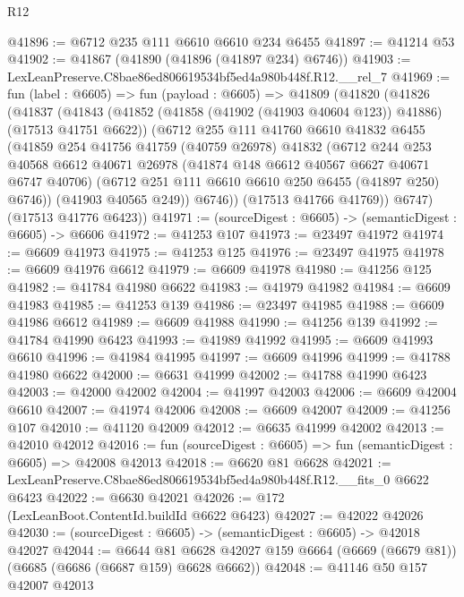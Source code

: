 \begin{lexlean}{R12}
\begin{coremodule}
@41896 := @6712 @235 @111 @6610 @6610 @234 @6455
@41897 := @41214 @53
@41902 := @41867 (@41890 (@41896 (@41897 @234) @6746))
@41903 := LexLeanPreserve.C8bae86ed806619534bf5ed4a980b448f.R12.__rel_7
@41969 := fun (label : @6605) =>
  fun (payload : @6605) =>
  @41809
    (@41820
      (@41826
        (@41837
          (@41843
            (@41852 (@41858 (@41902 (@41903 @40604 @123)) @41886) (@17513 @41751 @6622))
            (@6712
              @255
              @111
              @41760
              @6610
              @41832
              @6455
              (@41859
                @254
                @41756
                @41759
                (@40759 @26978)
                @41832
                (@6712
                  @244
                  @253
                  @40568
                  @6612
                  @40671
                  @26978
                  (@41874 @148 @6612 @40567 @6627 @40671 @6747 @40706)
                  (@6712 @251 @111 @6610 @6610 @250 @6455 (@41897 @250) @6746))
                (@41903 @40565 @249))
              @6746))
          (@17513 @41766 @41769))
        @6747)
      (@17513 @41776 @6423))
@41971 := (sourceDigest : @6605) -> (semanticDigest : @6605) -> @6606
@41972 := @41253 @107
@41973 := @23497 @41972
@41974 := @6609 @41973
@41975 := @41253 @125
@41976 := @23497 @41975
@41978 := @6609 @41976 @6612
@41979 := @6609 @41978
@41980 := @41256 @125
@41982 := @41784 @41980 @6622
@41983 := @41979 @41982
@41984 := @6609 @41983
@41985 := @41253 @139
@41986 := @23497 @41985
@41988 := @6609 @41986 @6612
@41989 := @6609 @41988
@41990 := @41256 @139
@41992 := @41784 @41990 @6423
@41993 := @41989 @41992
@41995 := @6609 @41993 @6610
@41996 := @41984 @41995
@41997 := @6609 @41996
@41999 := @41788 @41980 @6622
@42000 := @6631 @41999
@42002 := @41788 @41990 @6423
@42003 := @42000 @42002
@42004 := @41997 @42003
@42006 := @6609 @42004 @6610
@42007 := @41974 @42006
@42008 := @6609 @42007
@42009 := @41256 @107
@42010 := @41120 @42009
@42012 := @6635 @41999 @42002
@42013 := @42010 @42012
@42016 := fun (sourceDigest : @6605) => fun (semanticDigest : @6605) => @42008 @42013
@42018 := @6620 @81 @6628
@42021 := LexLeanPreserve.C8bae86ed806619534bf5ed4a980b448f.R12.__fits_0 @6622 @6423
@42022 := @6630 @42021
@42026 := @172 (LexLeanBoot.ContentId.buildId @6622 @6423)
@42027 := @42022 @42026
@42030 := (sourceDigest : @6605) -> (semanticDigest : @6605) -> @42018 @42027
@42044 := @6644
    @81
    @6628
    @42027
    @159
    @6664
    (@6669 (@6679 @81))
    (@6685 (@6686 (@6687 @159) @6628 @6662))
@42048 := @41146 @50 @157 @42007 @42013

\end{coremodule}
\end{lexlean}
